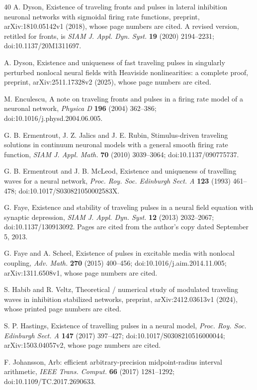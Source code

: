 \documentclass[11pt]{article}
\theoremstyle{definition}
\begin{document}
\begin{thebibliography}{40}
 A. Dyson, Existence of traveling fronts and pulses in lateral inhibition neuronal networks with sigmoidal firing rate functions, preprint, arXiv:1810.05142v1 (2018), whose page numbers are cited. A revised version, retitled for fronts, is \emph{SIAM J. Appl. Dyn. Syst.} \textbf{19} (2020) 2194--2231; doi:10.1137/20M1311697.

 A. Dyson, Existence and uniqueness of fast traveling pulses in singularly perturbed nonlocal neural fields with Heaviside nonlinearities: a complete proof, preprint, arXiv:2511.17328v2 (2025), whose page numbers are cited.

 M. Enculescu, A note on traveling fronts and pulses in a firing rate model of a neuronal network, \emph{Physica D} \textbf{196} (2004) 362--386; doi:10.1016/j.physd.2004.06.005.

 G. B. Ermentrout, J. Z. Jalics and J. E. Rubin, Stimulus-driven traveling solutions in continuum neuronal models with a general smooth firing rate function, \emph{SIAM J. Appl. Math.} \textbf{70} (2010) 3039--3064; doi:10.1137/090775737.

 G. B. Ermentrout and J. B. McLeod, Existence and uniqueness of travelling waves for a neural network, \emph{Proc. Roy. Soc. Edinburgh Sect. A} \textbf{123} (1993) 461--478; doi:10.1017/S030821050002583X.

 G. Faye, Existence and stability of traveling pulses in a neural field equation with synaptic depression, \emph{SIAM J. Appl. Dyn. Syst.} \textbf{12} (2013) 2032--2067; doi:10.1137/130913092. Pages are cited from the author's copy dated September 5, 2013.

 G. Faye and A. Scheel, Existence of pulses in excitable media with nonlocal coupling, \emph{Adv. Math.} \textbf{270} (2015) 400--456; doi:10.1016/j.aim.2014.11.005; arXiv:1311.6508v1, whose page numbers are cited.

 S. Habib and R. Veltz, Theoretical / numerical study of modulated traveling waves in inhibition stabilized networks, preprint, arXiv:2412.03613v1 (2024), whose printed page numbers are cited.

 S. P. Hastings, Existence of travelling pulses in a neural model, \emph{Proc. Roy. Soc. Edinburgh Sect. A} \textbf{147} (2017) 397--427; doi:10.1017/S0308210516000044; arXiv:1503.04057v2, whose page numbers are cited.

 F. Johansson, Arb: efficient arbitrary-precision midpoint-radius interval arithmetic, \emph{IEEE Trans. Comput.} \textbf{66} (2017) 1281--1292; doi:10.1109/TC.2017.2690633.


\end{thebibliography}
\end{document}

